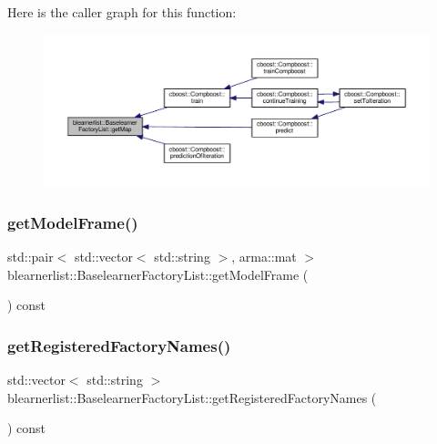Here is the caller graph for this function\+:\nopagebreak
\begin{figure}[H]
\begin{center}
\leavevmode
\includegraphics[width=350pt]{classblearnerlist_1_1_baselearner_factory_list_aeb573190a689af611e2f80ca8ed65d95_icgraph}
\end{center}
\end{figure}
\mbox{\label{classblearnerlist_1_1_baselearner_factory_list_a1f0d601a978c0f50cf9b6228c1f92ce8}} 
\subsubsection{\texorpdfstring{get\+Model\+Frame()}{getModelFrame()}}
{\footnotesize\ttfamily std\+::pair$<$ std\+::vector$<$ std\+::string $>$, arma\+::mat $>$ blearnerlist\+::\+Baselearner\+Factory\+List\+::get\+Model\+Frame (\begin{DoxyParamCaption}{ }\end{DoxyParamCaption}) const}

\mbox{\label{classblearnerlist_1_1_baselearner_factory_list_ac4dc76e908affe9aae7b7278cec22875}} 
\subsubsection{\texorpdfstring{get\+Registered\+Factory\+Names()}{getRegisteredFactoryNames()}}
{\footnotesize\ttfamily std\+::vector$<$ std\+::string $>$ blearnerlist\+::\+Baselearner\+Factory\+List\+::get\+Registered\+Factory\+Names (\begin{DoxyParamCaption}{ }\end{DoxyParamCaption}) const}

